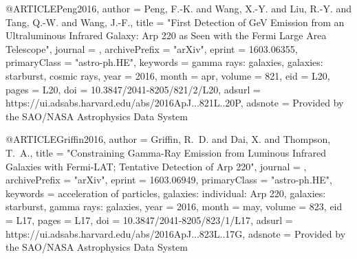 \documentclass[useAMS,usenatbib]{mnras}
\begin{document}
{{{{{{@ARTICLE{Peng2016,
   author = {{Peng}, F.-K. and {Wang}, X.-Y. and {Liu}, R.-Y. and {Tang}, Q.-W. and 
	{Wang}, J.-F.},
    title = "{First Detection of GeV Emission from an Ultraluminous Infrared Galaxy: Arp 220 as Seen with the Fermi Large Area Telescope}",
  journal = {\apjl},
archivePrefix = "arXiv",
   eprint = {1603.06355},
 primaryClass = "astro-ph.HE",
 keywords = {gamma rays: galaxies, galaxies: starburst, cosmic rays},
     year = 2016,
    month = apr,
   volume = 821,
      eid = {L20},
    pages = {L20},
      doi = {10.3847/2041-8205/821/2/L20},
   adsurl = {https://ui.adsabs.harvard.edu/abs/2016ApJ...821L..20P},
  adsnote = {Provided by the SAO/NASA Astrophysics Data System}
}

@ARTICLE{Griffin2016,
   author = {{Griffin}, R.~D. and {Dai}, X. and {Thompson}, T.~A.},
    title = "{Constraining Gamma-Ray Emission from Luminous Infrared Galaxies with Fermi-LAT; Tentative Detection of Arp 220}",
  journal = {\apjl},
archivePrefix = "arXiv",
   eprint = {1603.06949},
 primaryClass = "astro-ph.HE",
 keywords = {acceleration of particles, galaxies: individual: Arp 220, galaxies: starburst, gamma rays: galaxies},
     year = 2016,
    month = may,
   volume = 823,
      eid = {L17},
    pages = {L17},
      doi = {10.3847/2041-8205/823/1/L17},
   adsurl = {https://ui.adsabs.harvard.edu/abs/2016ApJ...823L..17G},
  adsnote = {Provided by the SAO/NASA Astrophysics Data System}
}

}}}}}}
\end{document}
